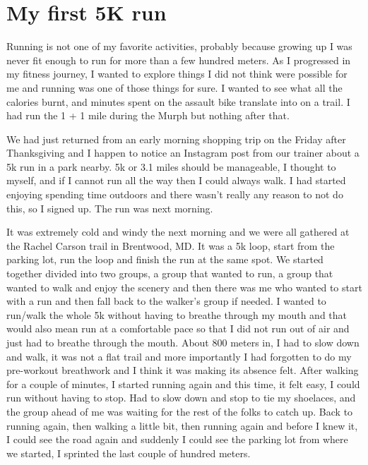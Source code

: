 \documentclass[
  oneside]{book}
\begin{document}
\hypertarget{my-first-5k-run}{%
\section{My first 5K run}\label{my-first-5k-run}}

Running is not one of my favorite activities, probably because growing up I was never fit enough to run for more than a few hundred meters. As I progressed in my fitness journey, I wanted to explore things I did not think were possible for me and running was one of those things for sure. I wanted to see what all the calories burnt, and minutes spent on the assault bike translate into on a trail. I had run the 1 + 1 mile during the Murph but nothing after that.

We had just returned from an early morning shopping trip on the Friday after Thanksgiving and I happen to notice an Instagram post from our trainer about a 5k run in a park nearby. 5k or 3.1 miles should be manageable, I thought to myself, and if I cannot run all the way then I could always walk. I had started enjoying spending time outdoors and there wasn't really any reason to not do this, so I signed up. The run was next morning.

It was extremely cold and windy the next morning and we were all gathered at the Rachel Carson trail in Brentwood, MD. It was a 5k loop, start from the parking lot, run the loop and finish the run at the same spot. We started together divided into two groups, a group that wanted to run, a group that wanted to walk and enjoy the scenery and then there was me who wanted to start with a run and then fall back to the walker's group if needed. I wanted to run/walk the whole 5k without having to breathe through my mouth and that would also mean run at a comfortable pace so that I did not run out of air and just had to breathe through the mouth. About 800 meters in, I had to slow down and walk, it was not a flat trail and more importantly I had forgotten to do my pre-workout breathwork and I think it was making its absence felt. After walking for a couple of minutes, I started running again and this time, it felt easy, I could run without having to stop. Had to slow down and stop to tie my shoelaces, and the group ahead of me was waiting for the rest of the folks to catch up. Back to running again, then walking a little bit, then running again and before I knew it, I could see the road again and suddenly I could see the parking lot from where we started, I sprinted the last couple of hundred meters.
\end{document}
